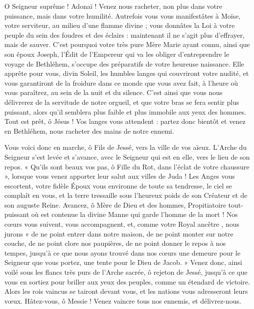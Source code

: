 \documentclass[%
fontsize=10%
,a6paper%
,DIV=15%
]{scrartcl}
\begin{document}
O Seigneur suprême ! Adonaï ! Venez nous racheter, non plus dans votre puissance, mais dans votre humilité. Autrefois vous vous manifestâtes à Moïse, votre serviteur, au milieu d’une flamme divine ; vous donnâtes la Loi à votre peuple du sein des foudres et des éclairs : maintenant il ne s’agit plus d’effrayer, mais de sauver. C’est pourquoi votre très pure Mère Marie ayant connu, ainsi que son époux Joseph, l’Édit de l’Empereur qui va les obliger d’entreprendre le voyage de Bethléhem, s’occupe des préparatifs de votre heureuse naissance. Elle apprête pour vous, divin Soleil, les humbles langes qui couvriront votre nudité, et vous garantiront de la froidure dans ce monde que vous avez fait, à l’heure où vous paraîtrez, au sein de la nuit et du silence. C’est ainsi que vous nous délivrerez de la servitude de notre orgueil, et que votre bras se fera sentir plus puissant, alors qu’il semblera plus faible et plus immobile aux yeux des hommes. Tout est prêt, ô Jésus ! Vos langes vous attendent : partez donc bientôt et venez en Bethléhem, nous racheter des mains de notre ennemi.


Vous voici donc en marche, ô Fils de Jessé, vers la ville de vos aïeux. L’Arche du Seigneur s’est levée et s’avance, avec le Seigneur qui est en elle, vers le lieu de son repos. « Qu’ils sont beaux vos pas, ô Fille du Rot, dans l’éclat de votre chaussure », lorsque vous venez apporter leur salut aux villes de Juda ! Les Anges vous escortent, votre fidèle Époux vous environne de toute sa tendresse, le ciel se complaît en vous, et la terre tressaille sous l’heureux poids de son Créateur et de son auguste Reine. Avancez, ô Mère de Dieu et des hommes, Propitiatoire tout-puissant où est contenue la divine Manne qui garde l’homme de la mort ! Nos cœurs vous suivent, vous accompagnent, et, comme votre Royal ancêtre , nous jurons « de ne point entrer dans notre maison, de ne point monter sur notre couche, de ne point clore nos paupières, de ne point donner le repos à nos tempes, jusqu’à ce que nous ayons trouvé dans nos cœurs une demeure pour le Seigneur que vous portez, une tente pour le Dieu de Jacob. » Venez donc, ainsi voilé sous les flancs très purs de l’Arche sacrée, ô rejeton de Jessé, jusqu’à ce que vous en sortiez pour briller aux yeux des peuples, comme un étendard de victoire. Alors les rois vaincus se tairont devant vous, et les nations vous adresseront leurs vœux. Hâtez-vous, ô Messie ! Venez vaincre tous nos ennemis, et délivrez-nous.
\end{document}
